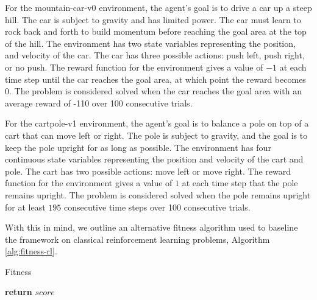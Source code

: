 \documentclass[12pt, final]{dalcsthesis}
\begin{document}
For the mountain-car-v0 environment, the agent's goal is to drive a car up a steep hill. The car is subject to gravity and has limited power. The car must learn to rock back and forth to build momentum before reaching the goal area at the top of the hill. The environment has two state variables representing the position, and velocity of the car. The car has three possible actions: push left, push right, or no push. The reward function for the environment gives a value of $-1$ at each time step until the car reaches the goal area, at which point the reward becomes $0$. The problem is considered solved when the car reaches the goal area with an average reward of -110 over 100 consecutive trials.

For the cartpole-v1 environment, the agent's goal is to balance a pole on top of a cart that can move left or right. The pole is subject to gravity, and the goal is to keep the pole upright for as long as possible. The environment has four continuous state variables representing the position and velocity of the cart and pole. The cart has two possible actions: move left or move right. The reward function for the environment gives a value of $1$ at each time step that the pole remains upright. The problem is considered solved when the pole remains upright for at least $195$ consecutive time steps over 100 consecutive trials.

With this in mind, we outline an alternative fitness algorithm used to baseline the framework on classical reinforcement learning problems, Algorithm \ref{alg:fitness-rl}.

\begin{algorithm}[hb]
	\caption{Fitness}
	\label{alg:fitness-rl}
	\begin{algorithmic}[1]
		\EndWhile
		\EndFor
		\State \textbf{return} $score$
		\EndProcedure
	\end{algorithmic}
\end{algorithm}
\end{document}
